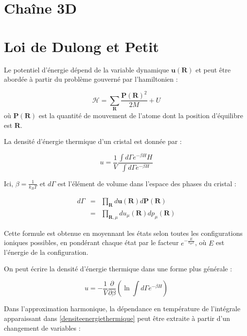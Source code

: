 \section{Chaîne 3D}

\section{Loi de Dulong et Petit}

Le potentiel d'énergie dépend de la variable dynamique $\mathbf{u(R)}$ et peut
être abordée à partir du problème gouverné par l'hamiltonien :

\begin{equation}
    \mathcal{H} = \sum_{\mathbf{R}} \frac{\mathbf{P(R)}^2}{2M} + U
\end{equation}
où $\mathbf{P(R)}$ est la quantité de mouvement de l'atome dont la position
d'équilibre est $\mathbf{R}$.

La densité d'énergie thermique d'un cristal est donnée par :

\begin{equation}
    u = \frac{1}{V} \frac{\int d\Gamma e^{-\beta H} H}{\int d\Gamma e^{-\beta H}}
\end{equation}

Ici, $\beta = \frac{1}{k_B T}$ et $d\Gamma$ est l'élément de volume dans
l'espace des phases du cristal :

\begin{eqnarray}
    d\Gamma & = & \prod_{\mathbf{R}} d\mathbf{u(R)} d\mathbf{P(R)}\\
     & = & \prod_{\mathbf{R},\mu} du_\mu (\mathbf{R}) dp_\mu (\mathbf{R})
\end{eqnarray}

Cette formule est obtenue en moyennant les états selon toutes les configurations
ioniques possibles, en pondérant chaque état par le facteur $e^{-\frac{E}{k_BT}}$,
où $E$ est l'énergie de la configuration.

On peut écrire la densité d'énergie thermique dans une forme plus générale :

\begin{equation}
    u = - \frac{1}{V} \frac{\partial}{\partial \beta} \left( \ln \int d\Gamma e^{-\beta H} \right)
    \label{densiteenergiethermique}
\end{equation}

Dans l'approximation harmonique, la dépendance en température de l'intégrale
apparaissant dans \ref{densiteenergiethermique} peut être extraite à partir d'un
changement de variables :

